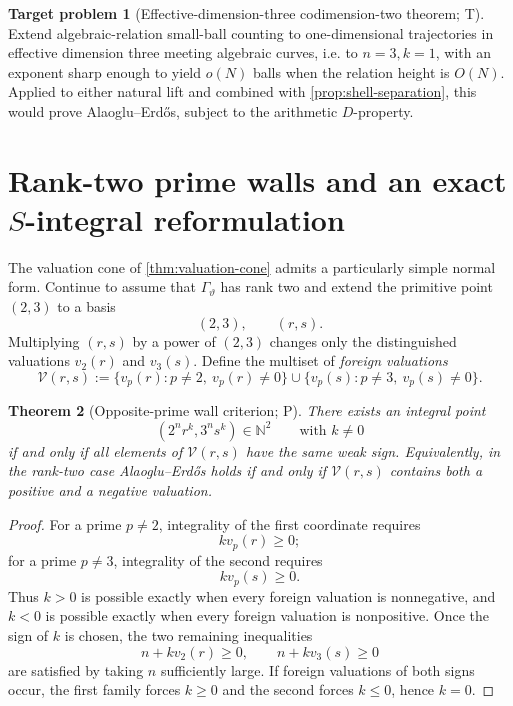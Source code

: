 \documentclass[10pt,oneside]{article}
\newtheorem{theorem}{Theorem}[section]
\theoremstyle{definition}
\newtheorem{problem}[theorem]{Target problem}
\theoremstyle{remark}
\newcommand{\N}{\mathbb N}
\newcommand{\thetaq}{\vartheta}
\newcommand{\statusP}{\textsc{P}}
\newcommand{\statusT}{\textsc{T}}
\begin{document}
\begin{problem}[Effective-dimension-three codimension-two theorem; \statusT]
\label{prob:codim-two-extension}
Extend algebraic-relation small-ball counting to one-dimensional trajectories in effective dimension three meeting algebraic curves, i.e. to \(n=3,k=1\), with an exponent sharp enough to yield \(o(N)\) balls when the relation height is \(O(N)\).  Applied to either natural lift and combined with \cref{prop:shell-separation}, this would prove Alaoglu--Erd\H{o}s, subject to the arithmetic \(D\)-property.
\end{problem}


\section{Rank-two prime walls and an exact \texorpdfstring{\(S\)}{S}-integral reformulation}
\label{sec:prime-walls}

The valuation cone of \cref{thm:valuation-cone} admits a particularly simple normal form.  Continue to assume that \(\Gamma_{\thetaq}\) has rank two and extend the primitive point \((2,3)\) to a basis
\[
 (2,3),\qquad (r,s).
\]
Multiplying \((r,s)\) by a power of \((2,3)\) changes only the distinguished valuations \(v_2(r)\) and \(v_3(s)\).  Define the multiset of \emph{foreign valuations}
\begin{equation}
 \mathscr V(r,s):=
 \{v_p(r):p\ne2,\ v_p(r)\ne0\}
 \cup
 \{v_p(s):p\ne3,\ v_p(s)\ne0\}.
\label{eq:foreign-valuations}
\end{equation}

\begin{theorem}[Opposite-prime wall criterion; \statusP]
\label{thm:opposite-walls}
There exists an integral point
\[
 (2^nr^k,3^ns^k)\in\N^2
 \qquad\text{with }k\ne0
\]
if and only if all elements of \(\mathscr V(r,s)\) have the same weak sign.  Equivalently, in the rank-two case Alaoglu--Erd\H{o}s holds if and only if \(\mathscr V(r,s)\) contains both a positive and a negative valuation.
\end{theorem}

\begin{proof}
For a prime \(p\ne2\), integrality of the first coordinate requires
\[
 k v_p(r)\ge0;
\]
for a prime \(p\ne3\), integrality of the second requires
\[
 k v_p(s)\ge0.
\]
Thus \(k>0\) is possible exactly when every foreign valuation is nonnegative, and \(k<0\) is possible exactly when every foreign valuation is nonpositive.  Once the sign of \(k\) is chosen, the two remaining inequalities
\[
 n+kv_2(r)\ge0,
 \qquad
 n+kv_3(s)\ge0
\]
are satisfied by taking \(n\) sufficiently large.  If foreign valuations of both signs occur, the first family forces \(k\ge0\) and the second forces \(k\le0\), hence \(k=0\).
\end{proof}
\end{document}
